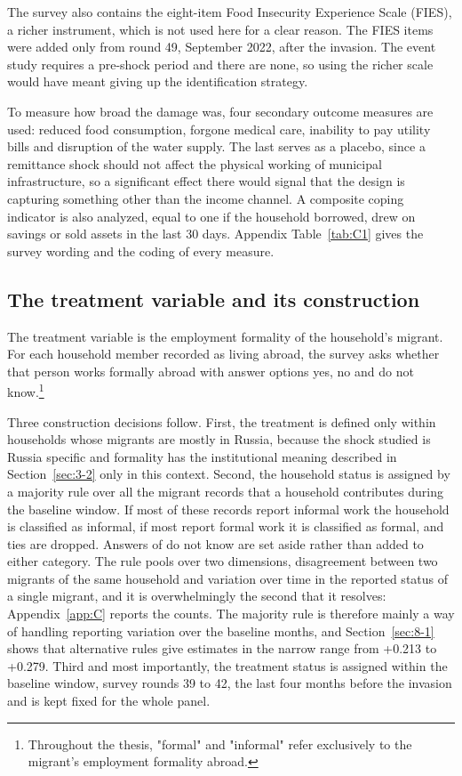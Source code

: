 The survey also contains the eight-item Food Insecurity Experience Scale (FIES), a richer instrument, which is not used here for a clear reason. The FIES items were added only from round 49, September 2022, after the invasion. The event study requires a pre-shock period and there are none, so using the richer scale would have meant giving up the identification strategy.

To measure how broad the damage was, four secondary outcome measures are used: reduced food consumption, forgone medical care, inability to pay utility bills and disruption of the water supply. The last serves as a placebo, since a remittance shock should not affect the physical working of municipal infrastructure, so a significant effect there would signal that the design is capturing something other than the income channel. A composite coping indicator is also analyzed, equal to one if the household borrowed, drew on savings or sold assets in the last 30 days. Appendix Table~\ref{tab:C1} gives the survey wording and the coding of every measure.

\subsection{The treatment variable and its construction}\label{sec:5-3}

The treatment variable is the employment formality of the household's migrant. For each household member recorded as living abroad, the survey asks whether that person works formally abroad with answer options yes, no and do not know.\footnote{Throughout the thesis, "formal" and "informal" refer exclusively to the migrant's employment formality abroad.}

Three construction decisions follow. First, the treatment is defined only within households whose migrants are mostly in Russia, because the shock studied is Russia specific and formality has the institutional meaning described in Section~\ref{sec:3-2} only in this context. Second, the household status is assigned by a majority rule over all the migrant records that a household contributes during the baseline window. If most of these records report informal work the household is classified as informal, if most report formal work it is classified as formal, and ties are dropped. Answers of do not know are set aside rather than added to either category. The rule pools over two dimensions, disagreement between two migrants of the same household and variation over time in the reported status of a single migrant, and it is overwhelmingly the second that it resolves: Appendix~\ref{app:C} reports the counts. The majority rule is therefore mainly a way of handling reporting variation over the baseline months, and Section~\ref{sec:8-1} shows that alternative rules give estimates in the narrow range from +0.213 to +0.279. Third and most importantly, the treatment status is assigned within the baseline window, survey rounds 39 to 42, the last four months before the invasion and is kept fixed for the whole panel.


